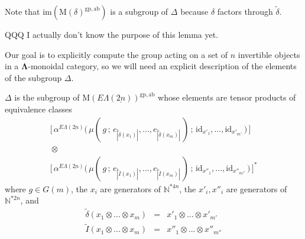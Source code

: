 \documentclass{amsbook} %
\newcommand{\ML}{\mathbf{\Lambda}}
\newcommand{\ELnn}{E\Lambda(\underline{2n})}
\numberwithin{section}{chapter}
\begin{document}
\begin{rem}\label{delta_neq_image}
Note that $\mathrm{im}(\mathrm{M}(\delta)^{\mathrm{gp, ab}})$ is a subgroup of $\Delta$ because $\delta$ factors through $\tilde{\delta}$.
\end{rem}



QQQ I actually don't know the purpose of this lemma yet.

Our goal is to explicitly compute the group acting on a set of $n$ invertible objects in a $\ML$-monoidal category, so we will need an explicit description of the elements of the subgroup $\Delta$.

\begin{lem} $\Delta$ is the subgroup of $\mathrm{M}(\ELnn)^{\mathrm{gp, ab}}$ whose elements are tensor products of equivalence classes
\[ \begin{array}{c}
			\big[ \, \alpha^{\ELnn}\big( \, \mu( \, g \, ; \, e_{|\tilde{\delta}(x_1)|}, ..., e_{|\tilde{\delta}(x_m)|} \, ) \, ; \, \mathrm{id}_{x'_1}, ...,  \mathrm{id}_{x'_{m'}} \, \big) \, \big] \\
			\, \otimes \, \\
			\big[ \, \alpha^{\ELnn}\big( \, \mu( \, g \, ; \, e_{|\tilde{I}(x_1)|}, ..., e_{|\tilde{I}(x_m)|} \, ) \, ; \, \mathrm{id}_{x''_1}, ...,  \mathrm{id}_{x''_{m''}} \, \big) \, \big]^*
		\end{array}
\] 
where $g \in G(m)$, the $x_i$ are generators of $\mathbb{N}^{\ast 4n}$, the $x'_i, x''_i$ are generators of $\mathbb{N}^{\ast 2n}$, and
\[ \begin{array}{rll}
			\tilde{\delta}( x_1 \otimes ... \otimes x_m) & = & x'_1 \otimes ... \otimes x'_{m'} \\
			\tilde{I}( x_1 \otimes ... \otimes x_m) & = & x''_1 \otimes ... \otimes x''_{m''}
		\end{array}
\]
\end{lem}
\end{document}
